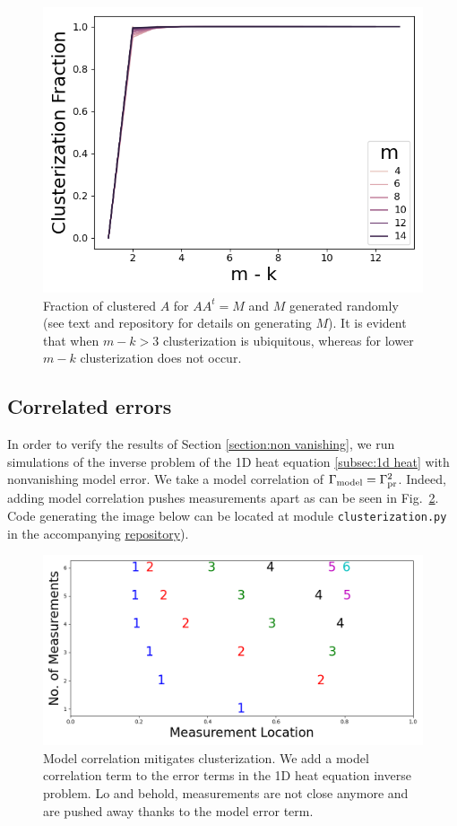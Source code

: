\begin{figure}
    \centering
    \includegraphics[height=0.5\textwidth]{simulations.png}
    \caption{Fraction of clustered $A$ for $AA^t = M$ and $M$
      generated randomly (see text and repository for details on
      generating $M$). It is evident that when $m-k >3$ clusterization
      is ubiquitous, whereas for lower $m-k$ clusterization does not
      occur.}
  \label{fig:sim AAt}
\end{figure}


\subsection{Correlated errors}\label{subsec:corr errors sims}
In order to verify the results of Section \ref{section:non vanishing},
we run simulations of the inverse problem of the 1D heat equation
\ref{subsec:1d heat} with nonvanishing model error. We take a model
correlation of \(\Gamma_{\textup{model}} = \Gamma_{\textup{pr}}^2 \). Indeed, adding model
correlation pushes measurements apart as can be seen in
Fig.~\ref{fig:corr errors}. Code generating the image below can be
located at module \texttt{clusterization.py} in the accompanying
\href{https://github.com/yairdaon/OED}{repository}).

\begin{figure}
    \centering
    \includegraphics[height=0.5\textwidth]{dst_modelError4.png}
    \caption{Model correlation mitigates clusterization. We add a
      model correlation term to the error terms in the 1D heat
      equation inverse problem. Lo and behold, measurements are not
      close anymore and are pushed away thanks to the model error
      term.}
  \label{fig:corr errors}
\end{figure}
